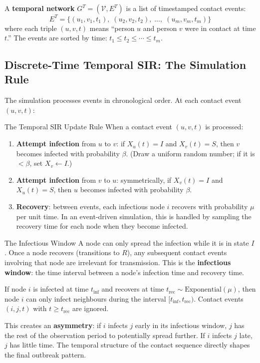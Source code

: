 A \textbf{temporal network} $G^T = (\mathcal{V}, E^T)$ is a list of timestamped contact events:
\[
E^T = \{(u_1, v_1, t_1),\; (u_2, v_2, t_2),\; \ldots,\; (u_m, v_m, t_m)\}
\]
where each triple $(u, v, t)$ means ``person $u$ and person $v$ were in contact at time $t$.'' The events are sorted by time: $t_1 \leq t_2 \leq \cdots \leq t_m$.

\subsection{Discrete-Time Temporal SIR: The Simulation Rule}

The simulation processes events in chronological order. At each contact event $(u, v, t)$:

\begin{conceptbox}{The Temporal SIR Update Rule}
When a contact event $(u, v, t)$ is processed:
\begin{enumerate}[noitemsep]
    \item \textbf{Attempt infection} from $u$ to $v$: if $X_u(t) = I$ and $X_v(t) = S$, then $v$ becomes infected with probability $\beta$. (Draw a uniform random number; if it is $< \beta$, set $X_v \leftarrow I$.)
    \item \textbf{Attempt infection} from $v$ to $u$: symmetrically, if $X_v(t) = I$ and $X_u(t) = S$, then $u$ becomes infected with probability $\beta$.
    \item \textbf{Recovery}: between events, each infectious node $i$ recovers with probability $\mu$ per unit time. In an event-driven simulation, this is handled by sampling the recovery time for each node when they become infected.
\end{enumerate}
\end{conceptbox}

\begin{conceptbox}{The Infectious Window}
A node can only spread the infection while it is in state $I$. Once a node recovers (transitions to $R$), any subsequent contact events involving that node are irrelevant for transmission. This is the \textbf{infectious window}: the time interval between a node's infection time and recovery time.

If node $i$ is infected at time $t_{\text{inf}}$ and recovers at time $t_{\text{rec}} \sim \text{Exponential}(\mu)$, then node $i$ can only infect neighbours during the interval $[t_{\text{inf}}, t_{\text{rec}})$. Contact events $(i, j, t)$ with $t \geq t_{\text{rec}}$ are ignored.

This creates an \textbf{asymmetry}: if $i$ infects $j$ early in its infectious window, $j$ has the rest of the observation period to potentially spread further. If $i$ infects $j$ late, $j$ has little time. The temporal structure of the contact sequence directly shapes the final outbreak pattern.
\end{conceptbox}

